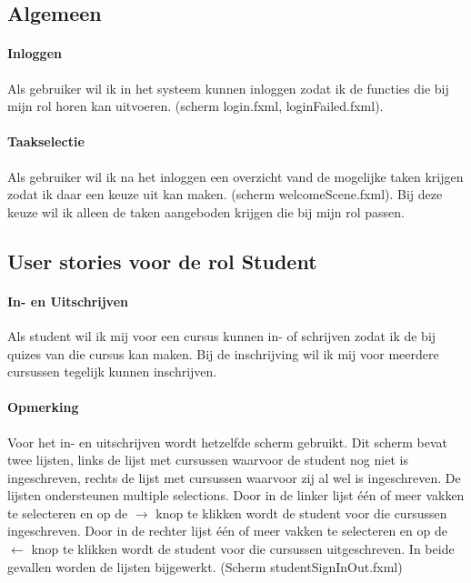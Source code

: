 \documentclass[11pt, a4paper]{article}
\begin{document}
\subsection{Algemeen}

\paragraph{Inloggen}
Als gebruiker wil ik in het systeem kunnen inloggen zodat ik de functies die bij mijn rol horen kan uitvoeren. (scherm login.fxml, loginFailed.fxml).

\paragraph{Taakselectie}
Als gebruiker wil ik na het inloggen een overzicht vand de mogelijke taken krijgen zodat ik daar een keuze uit kan maken. (scherm welcomeScene.fxml).
Bij deze keuze wil ik alleen de taken aangeboden krijgen die bij mijn rol passen.

\subsection{User stories voor de rol Student}

\paragraph{In- en Uitschrijven}
Als student wil ik mij voor een cursus kunnen in- of schrijven zodat ik de bij quizes van die cursus kan maken.
Bij de inschrijving wil ik mij voor meerdere cursussen tegelijk kunnen inschrijven.

\paragraph{Opmerking}
Voor het in- en uitschrijven wordt hetzelfde scherm gebruikt. Dit scherm bevat twee lijsten, links de lijst met cursussen waarvoor de student nog niet is ingeschreven, rechts de lijst met cursussen waarvoor zij al wel is ingeschreven.
De lijsten ondersteunen multiple selections.
Door in de linker lijst \'e\'en of meer vakken te selecteren en op de $\rightarrow$ knop te klikken wordt de student voor die cursussen ingeschreven.
Door in de rechter lijst \'e\'en of meer vakken te selecteren en op de $\leftarrow$ knop te klikken wordt de student voor die cursussen uitgeschreven.
In beide gevallen worden de lijsten bijgewerkt.
(Scherm studentSignInOut.fxml)
\end{document}
